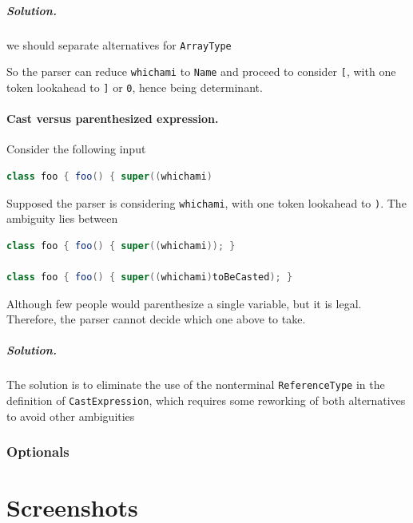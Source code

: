 \documentclass[12pt]{article}
\begin{document}
\subparagraph{Solution.} we should separate alternatives for \texttt{ArrayType}



So the parser can reduce \texttt{whichami} to \texttt{Name} and proceed to consider \texttt{[}, with one token lookahead to \texttt{]} or \texttt{0}, hence being determinant.

\paragraph{Cast versus parenthesized expression.}

Consider the following input
\begin{lstlisting}[language=Java]
class foo { foo() { super((whichami)
\end{lstlisting}
Supposed the parser is considering \texttt{whichami}, with one token lookahead to \texttt{)}. The ambiguity lies between
\begin{lstlisting}[language=Java]
class foo { foo() { super((whichami)); }

class foo { foo() { super((whichami)toBeCasted); }
\end{lstlisting}
Although few people would parenthesize a single variable, but it is legal. Therefore, the parser cannot decide which one above to take.

\subparagraph{Solution.} The solution is to eliminate the use of the nonterminal \texttt{ReferenceType} in the definition of \texttt{CastExpression}, which requires some reworking of both alternatives to avoid other ambiguities


\subsubsection{Optionals}


\section{Screenshots}
\newpage
\end{document}
